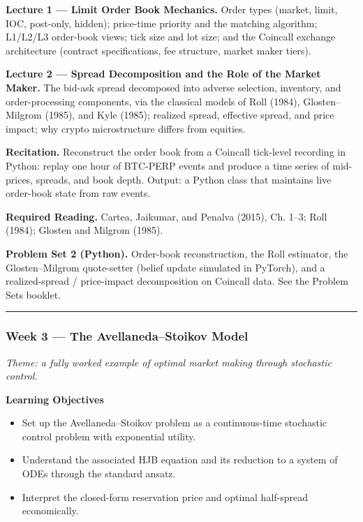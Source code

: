 \documentclass[
]{article}
\providecommand{\tightlist}{%
  \setlength{\itemsep}{0pt}\setlength{\parskip}{0pt}}
\begin{document}
\textbf{Lecture 1 --- Limit Order Book Mechanics.} Order types (market,
limit, IOC, post-only, hidden); price-time priority and the matching
algorithm; L1/L2/L3 order-book views; tick size and lot size; and the
Coincall exchange architecture (contract specifications, fee structure,
market maker tiers).

\textbf{Lecture 2 --- Spread Decomposition and the Role of the Market
Maker.} The bid-ask spread decomposed into adverse selection, inventory,
and order-processing components, via the classical models of Roll
(1984), Glosten--Milgrom (1985), and Kyle (1985); realized spread,
effective spread, and price impact; why crypto microstructure differs
from equities.

\textbf{Recitation.} Reconstruct the order book from a Coincall
tick-level recording in Python: replay one hour of BTC-PERP events and
produce a time series of mid-prices, spreads, and book depth. Output: a
Python class that maintains live order-book state from raw events.

\textbf{Required Reading.} Cartea, Jaikumar, and Penalva (2015), Ch.
1--3; Roll (1984); Glosten and Milgrom (1985).

\textbf{Problem Set 2 (Python).} Order-book reconstruction, the Roll
estimator, the Glosten--Milgrom quote-setter (belief update simulated in
PyTorch), and a realized-spread / price-impact decomposition on Coincall
data. See the Problem Sets booklet.

\begin{center}\rule{0.5\linewidth}{0.5pt}\end{center}

\subsubsection{Week 3 --- The Avellaneda--Stoikov
Model}\label{week-3-the-avellanedastoikov-model}

\emph{Theme: a fully worked example of optimal market making through
stochastic control.}

\textbf{Learning Objectives}

\begin{itemize}
\tightlist
\item
  Set up the Avellaneda--Stoikov problem as a continuous-time stochastic
  control problem with exponential utility.
\item
  Understand the associated HJB equation and its reduction to a system
  of ODEs through the standard ansatz.
\item
  Interpret the closed-form reservation price and optimal half-spread
  economically.
\end{itemize}
\end{document}

